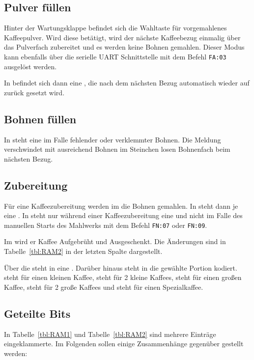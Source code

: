 \subsection{Pulver füllen}
Hinter der Wartungsklappe befindet sich die Wahltaste für vorgemahlenes Kaffeepulver.
Wird diese betätigt, wird der nächste Kaffeebezug einmalig über das Pulverfach zubereitet und es werden keine Bohnen gemahlen.
Dieser Modus kann ebenfalls über die serielle \ac{UART} Schnittstelle mit dem Befehl \texttt{FA:03} ausgelöst werden.

In  befindet sich dann eine , die nach dem nächsten Bezug automatisch wieder auf  zurück gesetzt wird.

\subsection{Bohnen füllen}
In  steht eine  im Falle fehlender oder verklemmter Bohnen.
Die Meldung verschwindet mit ausreichend Bohnen im Steinchen losen Bohnenfach beim nächsten Bezug.

\subsection{Zubereitung}\label{subsec:RAM:Zubereitung} %
Für eine Kaffeezubereitung werden im  die Bohnen gemahlen.
In  steht dann je eine .
In  steht nur während einer Kaffeezubereitung eine  und nicht im Falle des manuellen Starts des Mahlwerks mit dem Befehl \texttt{FN:07} oder \texttt{FN:09}.

Im  wird er Kaffee Aufgebrüht und Ausgeschenkt.
Die Änderungen sind in Tabelle~\ref{tbl:RAM2} in der letzten Spalte dargestellt.

Über die  steht in  eine .
Darüber hinaus steht in  die gewählte Portion kodiert.
 steht für einen kleinen Kaffee,  steht für 2 kleine Kaffees,  steht für einen großen Kaffee,  steht für 2 große Kaffees und  steht für einen Spezialkaffee.

\subsection{Geteilte Bits}
In Tabelle~\ref{tbl:RAM1} und Tabelle~\ref{tbl:RAM2} sind mehrere Einträge eingeklammerte.
Im Folgenden sollen einige Zusammenhänge gegenüber gestellt werden:

